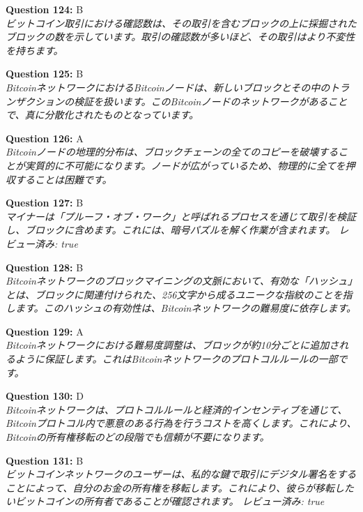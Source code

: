 \documentclass[12pt,a4paper]{article}
\begin{document}
\begin{enumerate}
{{{{{{{{\item \textbf{Question 124:} B
\\ \textit{ビットコイン取引における確認数は、その取引を含むブロックの上に採掘されたブロックの数を示しています。取引の確認数が多いほど、その取引はより不変性を持ちます。}

\item \textbf{Question 125:} B
\\ \textit{BitcoinネットワークにおけるBitcoinノードは、新しいブロックとその中のトランザクションの検証を扱います。このBitcoinノードのネットワークがあることで、真に分散化されたものとなっています。}

\item \textbf{Question 126:} A
\\ \textit{Bitcoinノードの地理的分布は、ブロックチェーンの全てのコピーを破壊することが実質的に不可能になります。ノードが広がっているため、物理的に全てを押収することは困難です。}

\item \textbf{Question 127:} B
\\ \textit{マイナーは「プルーフ・オブ・ワーク」と呼ばれるプロセスを通じて取引を検証し、ブロックに含めます。これには、暗号パズルを解く作業が含まれます。 レビュー済み: true}

\item \textbf{Question 128:} B
\\ \textit{Bitcoinネットワークのブロックマイニングの文脈において、有効な「ハッシュ」とは、ブロックに関連付けられた、256文字から成るユニークな指紋のことを指します。このハッシュの有効性は、Bitcoinネットワークの難易度に依存します。}

\item \textbf{Question 129:} A
\\ \textit{Bitcoinネットワークにおける難易度調整は、ブロックが約10分ごとに追加されるように保証します。これはBitcoinネットワークのプロトコルルールの一部です。}

\item \textbf{Question 130:} D
\\ \textit{Bitcoinネットワークは、プロトコルルールと経済的インセンティブを通じて、Bitcoinプロトコル内で悪意のある行為を行うコストを高くします。これにより、Bitcoinの所有権移転のどの段階でも信頼が不要になります。}

\item \textbf{Question 131:} B
\\ \textit{ビットコインネットワークのユーザーは、私的な鍵で取引にデジタル署名をすることによって、自分のお金の所有権を移転します。これにより、彼らが移転したいビットコインの所有者であることが確認されます。
レビュー済み: true}

}}}}}}}}
\end{enumerate}
\end{document}
